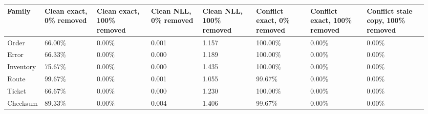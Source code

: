 \begin{tabular}{llllllll}
\toprule
Family &
Clean exact, 0\% removed &
Clean exact, 100\% removed &
Clean NLL, 0\% removed &
Clean NLL, 100\% removed &
Conflict exact, 0\% removed &
Conflict exact, 100\% removed &
Conflict stale copy, 100\% removed \\
\midrule
Order & 66.00\% & 0.00\% & 0.001 & 1.157 & 100.00\% & 0.00\% & 0.00\% \\
Error & 66.33\% & 0.00\% & 0.000 & 1.189 & 100.00\% & 0.00\% & 0.00\% \\
Inventory & 75.67\% & 0.00\% & 0.000 & 1.435 & 100.00\% & 0.00\% & 0.00\% \\
Route & 99.67\% & 0.00\% & 0.001 & 1.055 & 99.67\% & 0.00\% & 0.00\% \\
Ticket & 66.67\% & 0.00\% & 0.000 & 1.230 & 100.00\% & 0.00\% & 0.00\% \\
Checksum & 89.33\% & 0.00\% & 0.004 & 1.406 & 99.67\% & 0.00\% & 0.00\% \\
\bottomrule
\end{tabular}